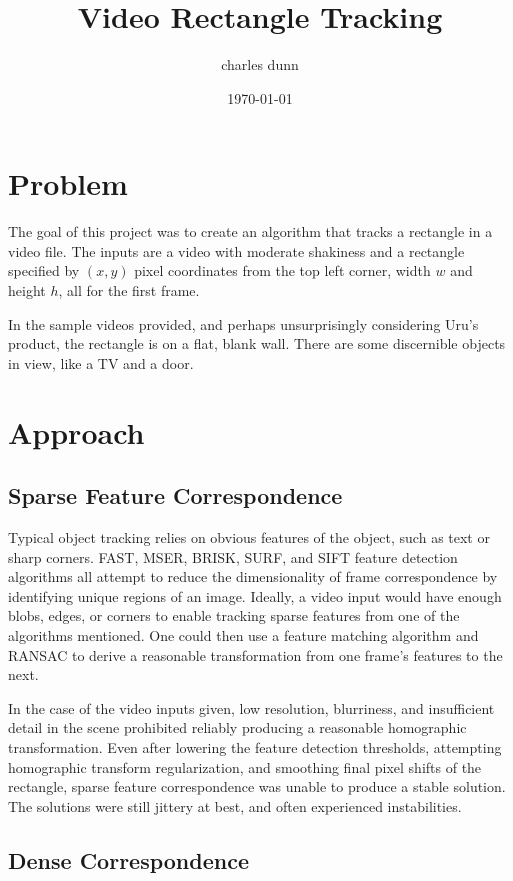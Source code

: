 \documentclass{article}
\title{Video Rectangle Tracking}
\author{charles dunn}
\date{\today}
\begin{document}
\maketitle

\section{Problem}

The goal of this project was to create an algorithm that tracks a rectangle in a video file. The inputs are a video with moderate shakiness and a rectangle specified by $(x,y)$ pixel coordinates from the top left corner, width $w$ and height $h$, all for the first frame.

In the sample videos provided, and perhaps unsurprisingly considering Uru's product, the rectangle is on a flat, blank wall. There are some discernible objects in view, like a TV and a door.

\section{Approach}

\subsection{Sparse Feature Correspondence}

Typical object tracking relies on obvious features of the object, such as text or sharp corners. FAST, MSER, BRISK, SURF, and SIFT feature detection algorithms all attempt to reduce the dimensionality of frame correspondence by identifying unique regions of an image. Ideally, a video input would have enough blobs, edges, or corners to enable tracking sparse features from one of the algorithms mentioned. One could then use a feature matching algorithm and RANSAC to derive a reasonable transformation from one frame's features to the next. 

In the case of the video inputs given, low resolution, blurriness, and insufficient detail in the scene prohibited reliably producing a reasonable homographic transformation. Even after lowering the feature detection thresholds, attempting homographic transform regularization, and smoothing final pixel shifts of the rectangle, sparse feature correspondence was unable to produce a stable solution. The solutions were still jittery at best, and often experienced instabilities.

\subsection{Dense Correspondence}
\end{document}
